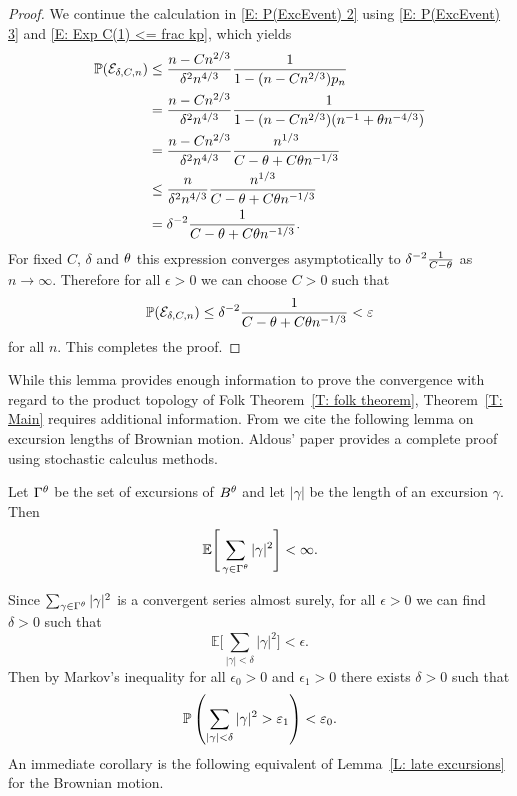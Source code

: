 \begin{proof}
	We continue the calculation in \eqref{E: P(ExcEvent) 2} using \eqref{E: P(ExcEvent) 3} and \eqref{E: Exp C(1) <= frac kp},
	which yields
	\begin{equation*}
	\begin{aligned}
	\mathbb{P}(\mathcal{E}_{\delta, C, n}) 
	&\leq \frac{n-Cn^{2 / 3}}{\delta^2 n^{4 / 3}} \frac{1}{1-(n-Cn^{2 / 3}) p_n} \\
	&= \frac{n-Cn^{2 / 3}}{\delta^2 n^{4 / 3}} \frac{1}{1-(n-Cn^{2 / 3})(n^{-1} + \theta n^{-4 / 3})} \\
	&= \frac{n-Cn^{2 / 3}}{\delta^2 n^{4 / 3}} \frac{n^{1 / 3}}{C-\theta+C\theta n^{-1 / 3}} \\
	&\leq \frac{n}{\delta^2 n^{4 / 3}} \frac{n^{1 / 3}}{C-\theta+C\theta n^{-1 / 3}} \\
	&= \delta^{-2} \frac{1}{C-\theta+C\theta n^{-1 / 3}}.
	\end{aligned}
	\end{equation*}
	For fixed $C$, $\delta$ and $\theta$
	this expression converges asymptotically to $\delta^{-2} \frac{1}{C-\theta}$ as $n \rightarrow \infty$.
	Therefore for all $\epsilon>0$ we can choose $C>0$ such that
	\begin{equation*}
		\mathbb{P}(\mathcal{E}_{\delta, C, n}) \leq \delta^{-2} \frac{1}{C-\theta+C\theta n^{-1 / 3}} < \varepsilon
	\end{equation*}
	for all $n$. 
	This completes the proof.
\end{proof}

While this lemma provides enough information to prove the convergence with regard to the product topology of Folk Theorem~\ref{T: folk theorem},
Theorem~\ref{T: Main} requires additional information.
From \cite[Lemma 25, p.843]{Aldous.1997} we cite the following lemma on excursion lengths of Brownian motion.
Aldous' paper provides a complete proof using stochastic calculus methods.
\begin{lemma} \label{L: BM in ld}
	Let $\Gamma^{\theta}$ be the set of excursions of $B^{\theta}$ and let $|\gamma|$ be the length of an excursion $\gamma$.
	Then
	\begin{equation*}
		\mathbb{E}\Bigg[\sum_{\gamma \in \Gamma^{\theta}} |\gamma|^2\Bigg] < \infty.
	\end{equation*}
\end{lemma}

Since $\sum_{\gamma \in \Gamma^{\theta}} |\gamma|^2$ is a convergent series almost surely,
for all $\epsilon > 0$ we can find $\delta > 0$ such that
\begin{equation} \label{E: gamma delta epsilon}
	\mathbb{E}\Bigg[\sum_{|\gamma| < \delta} |\gamma|^2\Bigg] < \epsilon.
\end{equation}
Then by Markov's inequality for all $\epsilon_0 > 0$ and $\epsilon_1 > 0$ there exists $\delta > 0$ such that
\begin{equation} \label{E: sum gamma < delta}
	\mathbb{P}\left(\sum_{|\gamma| < \delta} |\gamma|^2 > \varepsilon_1\right) < \varepsilon_0.
\end{equation}
An immediate corollary is the following equivalent of Lemma~\ref{L: late excursions} for the Brownian motion.

